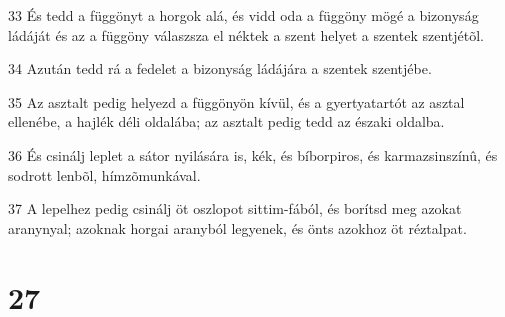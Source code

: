 \par 33 És tedd a függönyt a horgok alá, és vidd oda a függöny mögé a bizonyság ládáját és az a függöny válaszsza el néktek a szent helyet a szentek szentjétõl.
\par 34 Azután tedd rá a fedelet a bizonyság ládájára a szentek szentjébe.
\par 35 Az asztalt pedig helyezd a függönyön kívül, és a gyertyatartót az asztal ellenébe, a hajlék déli oldalába; az asztalt pedig tedd az északi oldalba.
\par 36 És csinálj leplet a sátor nyilására is, kék, és bíborpiros, és karmazsinszínû, és sodrott lenbõl, hímzõmunkával.
\par 37 A lepelhez pedig csinálj öt oszlopot sittim-fából, és borítsd meg azokat aranynyal; azoknak horgai aranyból legyenek, és önts azokhoz öt réztalpat.

\chapter{27}

